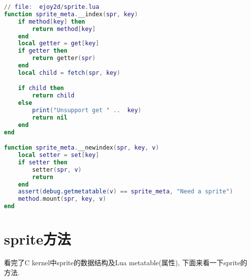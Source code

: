 {\begin{lstlisting}[language=lua]
// file:  ejoy2d/sprite.lua
function sprite_meta.__index(spr, key)
	if method[key] then
		return method[key]
	end
	local getter = get[key]
	if getter then
		return getter(spr)
	end
	local child = fetch(spr, key)

	if child then
		return child
	else
		print("Unsupport get " ..  key)
		return nil
	end
end

function sprite_meta.__newindex(spr, key, v)
	local setter = set[key]
	if setter then
		setter(spr, v)
		return
	end
	assert(debug.getmetatable(v) == sprite_meta, "Need a sprite")
	method.mount(spr, key, v)
end
\end{lstlisting}

}

\section {\ZHH sprite方法} {

    {看完了C kernel中sprite的数据结构及Lua metatable(属性), 下面来看一下sprite的方法.}\par

}



